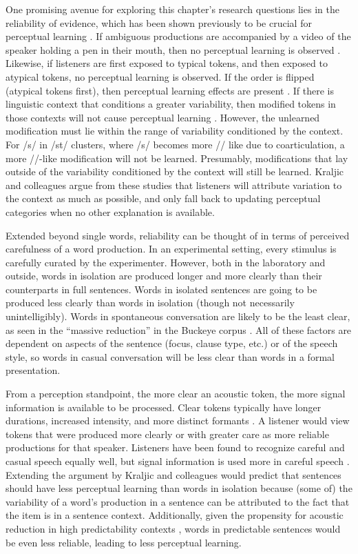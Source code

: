 One promising avenue for exploring this chapter's research questions lies in the reliability of evidence, which has been shown previously to be crucial for perceptual learning \citep{Kraljic2008, Kraljic2008a}.
If ambiguous productions are accompanied by a video of the speaker holding a pen in their mouth, then no perceptual learning is observed \citep{Kraljic2008}.
Likewise, if listeners are first exposed to typical tokens, and then exposed to atypical tokens, no perceptual learning is observed.
If the order is flipped (atypical tokens first), then perceptual learning effects are present \citep{Kraljic2008}.
If there is linguistic context that conditions a greater variability, then modified tokens in those contexts will not cause perceptual learning \citep{Kraljic2008a}.
However, the unlearned modification must lie within the range of variability conditioned by the context.
For /s/ in /st\textturnr/ clusters, where /s/ becomes more /\textesh/ like due to coarticulation, a more /\textesh/-like modification will not be learned.
Presumably, modifications that lay outside of the variability conditioned by the context will still be learned.
Kraljic and colleagues argue from these studies that listeners will attribute variation to the context as much as possible, and only fall back to updating perceptual categories when no other explanation is available.

Extended beyond single words, reliability can be thought of in terms of perceived carefulness of a word production.
In an experimental setting, every stimulus is carefully curated by the experimenter.
However, both in the laboratory and outside, words in isolation are produced longer and more clearly than their counterparts in full sentences.
Words in isolated sentences are going to be produced less clearly than words in isolation (though not necessarily unintelligibly).
Words in spontaneous conversation are likely to be the least clear, as seen in the ``massive reduction'' in the Buckeye corpus \citep{Johnson2004, Dilts2013}.
All of these factors are dependent on aspects of the sentence (focus, clause type, etc.) or of the speech style, so words in casual conversation will be less clear than words in a formal presentation.

From a perception standpoint, the more clear an acoustic token, the more signal information is available to be processed.
Clear tokens typically have longer durations, increased intensity, and more distinct formants \citep{Krause2004}.
A listener would view tokens that were produced more clearly or with greater care as more reliable productions for that speaker.
Listeners have been found to recognize careful and casual speech equally well, but signal information is used more in careful speech \citep{Sumner2015}.
Extending the argument by Kraljic and colleagues would predict that sentences should have less perceptual learning than words in isolation because (some of) the variability of a word's production in a sentence can be attributed to the fact that the item is in a sentence context.
Additionally, given the propensity for acoustic reduction in high predictability contexts \citep{Scarborough2010}, words in predictable sentences would be even less reliable, leading to less perceptual learning.

